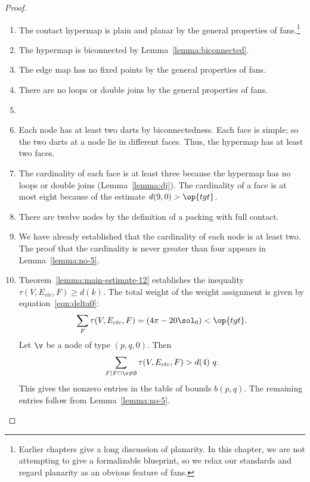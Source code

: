 \begin{proof}
\begin{enumerate}
\item {} The contact hypermap is plain and planar by the
  general properties of fans.\footnote{Earlier chapters give a long
    discussion of planarity.  In this chapter, we are not attempting
    to give a formalizable blueprint, so we relax our standards and
    regard planarity as an obvious feature of fans.}
\item {} The hypermap is biconnected by
  Lemma~\ref{lemma:biconnected}.
\item {} The
  edge map has no fixed points by the general properties of fans.
\item {}
  There are no loops or double joins by the general properties of
  fans.
\item {} 
\item {} Each node has at least two darts by
  biconnectedness. Each face is simple; so the two darts at a node lie
  in different faces.  Thus, the hypermap has at least two faces.
\item {} The cardinality of each face is at least three
  because the hypermap has no loops or double joins (Lemma~\ref{lemma:dj}).
  The cardinality of a face is at most eight because of the estimate
  $d(9,0)>\op{tgt}$.
\item {} There are twelve nodes by the definition of a
  packing with full contact.
\item {} We have already established that the cardinality
  of each node is at least two.  The proof that the cardinality is
  never  greater than four appears in Lemma~\ref{lemma:no-5}.
\item {} Theorem~\ref{lemma:main-estimate-12} establishes 
 the inequality $\tau(V,E_{ctc},F)\ge d(k)$.
  The total weight of the weight assignment is given by
  equation~\eqref{eqn:delta0}:
\[
  \sum_F \tau(V,E_{ctc},F) = (4\pi - 20\sol_0) < \op{tgt}.
\]
%
Let $\v$ be a node of type $(p,q,0)$.  
Then
\[
\sum_{F\mid F\cap \v\ne\emptyset}\tau(V,E_{ctc},F) > d(4)~q.
\]
This gives the nonzero entries in the table of bounds $b(p,q)$.  The
remaining entries follow from Lemma~\ref{lemma:no-5}.
\end{enumerate}
\end{proof}




